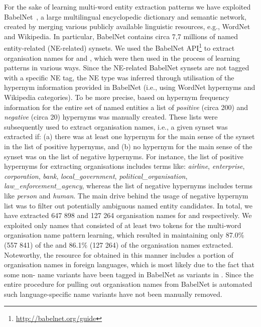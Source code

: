 \documentclass[output=paper]{langsci/langscibook}
\begin{document}
For the sake of learning multi-word entity extraction patterns we have exploited BabelNet~\citep{navigli-12},
a large multilingual encyclopedic dictionary and semantic network, created by merging various publicly available linguistic resources, e.g., WordNet and Wikipedia. In particular, BabelNet contains circa 7,7 millions of named entity-related (NE-related) synsets. We used the BabelNet API\footnote{\url{http://babelnet.org/guide}} to extract organisation names for  and , which were then used in the process of learning patterns in various ways. Since the NE-related BabelNet synsets are not tagged with a specific NE tag, the NE type was inferred through utilisation of the hypernym information provided in BabelNet (i.e., using WordNet hypernyms and Wikipedia categories). To be more precise, based on hypernym frequency information for the entire set of named entities a list of \textit{positive} (circa 200) and \textit{negative} (circa 20) hypernyms was manually created. These lists were subsequently used to extract organisation names, i.e., a given synset was extracted if: (a) there was at least one hypernym for the main sense of the synset in the list of positive hypernyms, and (b) no hypernym for the main sense of the synset was on the list of negative hypernyms. For instance, the list of positive hypernyms for extracting organisations includes terms like: \textit{airline}, \textit{enterprise}, \textit{corporation}, \textit{bank}, \textit{local\_government}, \textit{political\_organisation}, \textit{law\_enforcement\_agency}, whereas the list of negative hypernyms includes terms like \textit{person} and \textit{human}. The main drive behind the usage of negative hypernym list was to filter out potentially ambiguous named entity candidates. In total, we have extracted 647 898 and 127 264 organisation names for  and  respectively. We exploited only names that consisted of at least two tokens for the multi-word organisation name pattern learning, which resulted in maintaining only 87.0\% (557 841) of the  and 86.1\% (127 264) of the  organisation names extracted. Noteworthy, the resource for  obtained in this manner includes a portion of organisation names in foreign languages, which is most likely due to the fact that some non- name variants have been tagged in BabelNet as variants in . Since the entire procedure for pulling out organisation names from BabelNet is automated such language-specific name variants have not been manually removed.
\end{document}
